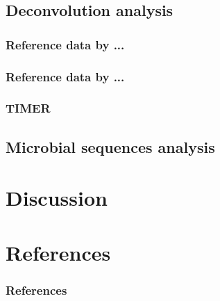 \documentclass{beamer}
\begin{document}
        \subsection{Deconvolution analysis}
            \subsubsection{Reference data by ...}

            \subsubsection{Reference data by ...}

            \subsubsection{TIMER}

        \subsection{Microbial sequences analysis}

    \section{Discussion}

    \section{References}
    \begin{frame}[allowframebreaks]
        \frametitle{References}
        
        
    \end{frame}
\end{document}
